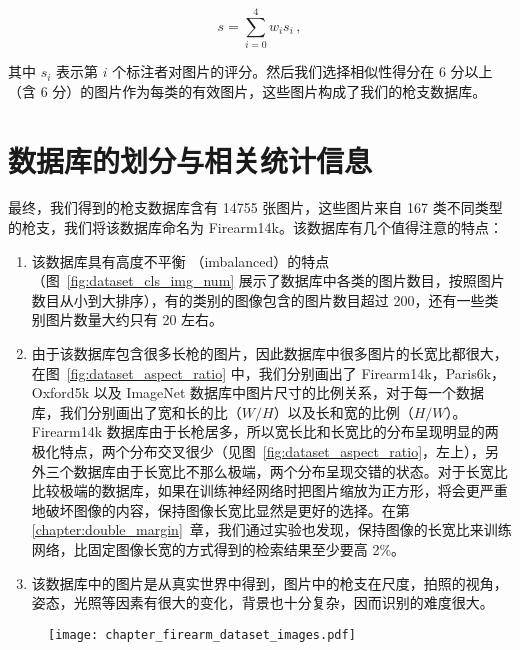 \begin{equation}
s = \sum_{i=0}^{4}w_{i}s_{i}\, ,
\end{equation}

其中 $s_i$ 表示第 $i$ 个标注者对图片的评分。然后我们选择相似性得分在 6 分以上（含 6 分）的图片作为每类的有效图片，这些图片构成了我们的枪支数据库。


\section{数据库的划分与相关统计信息}\label{sec:dataset_stats}
最终，我们得到的枪支数据库含有 14755 张图片，这些图片来自 167 类不同类型的枪支，我们将该数据库命名为 Firearm14k。该数据库有几个值得注意的特点：

\begin{enumerate}
\item  该数据库具有高度不平衡 （imbalanced）的特点（图~\ref{fig:dataset_cls_img_num} 展示了数据库中各类的图片数目，按照图片数目从小到大排序），有的类别的图像包含的图片数目超过 200，还有一些类别图片数量大约只有 20 左右。

\item  由于该数据库包含很多长枪的图片，因此数据库中很多图片的长宽比都很大，在图~\ref{fig:dataset_aspect_ratio} 中，我们分别画出了 Firearm14k，Paris6k，Oxford5k 以及 ImageNet 数据库中图片尺寸的比例关系，对于每一个数据库，我们分别画出了宽和长的比（$W/H$）以及长和宽的比例（$H/W$）。Firearm14k 数据库由于长枪居多，所以宽长比和长宽比的分布呈现明显的两极化特点，两个分布交叉很少（见图~\ref{fig:dataset_aspect_ratio}，左上），另外三个数据库由于长宽比不那么极端，两个分布呈现交错的状态。对于长宽比比较极端的数据库，如果在训练神经网络时把图片缩放为正方形，将会更严重地破坏图像的内容，保持图像长宽比显然是更好的选择。在第 \ref{chapter:double_margin}~章，我们通过实验也发现，保持图像的长宽比来训练网络，比固定图像长宽的方式得到的检索结果至少要高 2\%。

\item 该数据库中的图片是从真实世界中得到，图片中的枪支在尺度，拍照的视角，姿态，光照等因素有很大的变化，背景也十分复杂，因而识别的难度很大。
\end{enumerate}

\begin{figure}[!t]
	\centering
	\texttt{[image: chapter\_firearm\_dataset\_images.pdf]}
	\label{fig:dataset_sample_images}
\end{figure}


